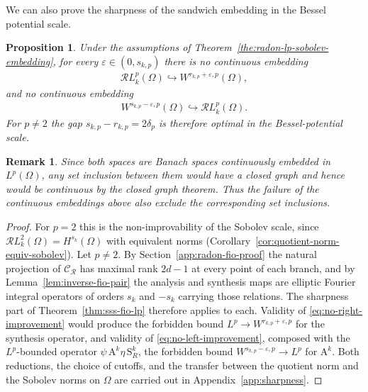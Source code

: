\documentclass[12pt]{article}
\numberwithin{equation}{section}
\newtheorem{remark}{Remark}
\newtheorem{proposition}{Proposition}[section]
\numberwithin{figure}{section}
\numberwithin{equation}{section}
\begin{document}
We can also prove the sharpness of the sandwich embedding in the Bessel potential scale.
\begin{proposition}
\label{prop:radon-lp-sandwich-sharp}
Under the assumptions of Theorem~\ref{the:radon-lp-sobolev-embedding}, for every
$\varepsilon\in(0,s_{k,p})$ there is no continuous embedding
\begin{align}
    \mathcal{R}L^p_k(\Omega)\hookrightarrow W^{r_{k,p}+\varepsilon,p}(\Omega),
    \label{eq:no-right-improvement}
\end{align}
and no continuous embedding
\begin{align}
    W^{s_{k,p}-\varepsilon,p}(\Omega)\hookrightarrow\mathcal{R}L^p_k(\Omega).
    \label{eq:no-left-improvement}
\end{align}
For $p\neq2$ the gap $s_{k,p}-r_{k,p}=2\delta_p$ is therefore optimal in the
Bessel-potential scale.
\end{proposition}
\begin{remark}
Since both spaces are Banach spaces continuously embedded in
$L^p(\Omega)$, any set inclusion between them would have a closed
graph and hence would be continuous by the closed graph theorem. 
Thus the failure of the
continuous embeddings above also exclude the corresponding set
inclusions.
\end{remark}

\begin{proof}
For $p=2$ this is the non-improvability of the Sobolev scale, since
$\mathcal{R}L^2_k(\Omega)=H^{s_k}(\Omega)$ with equivalent norms
(Corollary~\ref{cor:quotient-norm-equiv-sobolev}).  Let $p\neq2$.  By
Section~\ref{app:radon-fio-proof} the natural projection of
$\mathcal{C}_{\mathcal R}$ has maximal rank $2d-1$ at every point of each branch, and by
Lemma~\ref{lem:inverse-fio-pair} the analysis and synthesis maps are elliptic Fourier
integral operators of orders $s_k$ and $-s_k$ carrying those relations. The sharpness
part of Theorem~\ref{thm:sss-fio-lp} therefore applies to each.  Validity of
\eqref{eq:no-right-improvement} would produce the forbidden bound
$L^p\to W^{r_{k,p}+\varepsilon,p}$ for the synthesis operator, and validity of
\eqref{eq:no-left-improvement}, composed with the $L^p$-bounded operator
$\psi\,\mathrm{A}^k\eta\,\mathrm{S}^k_R$, the forbidden bound
$W^{s_{k,p}-\varepsilon,p}\to L^p$ for $\mathrm{A}^k$.  Both reductions, the choice of
cutoffs, and the transfer between the quotient norm and the Sobolev norms on $\Omega$
are carried out in Appendix~\ref{app:sharpness}.
\end{proof}
\end{document}
